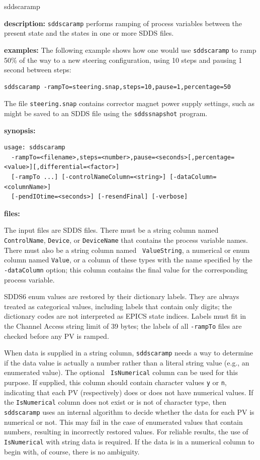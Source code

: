 \begin{sddsprog}{sddscaramp}
\item \textbf{description:}
\verb+sddscaramp+ performs ramping of process variables between
the present state and the states in one or more SDDS files.

\item \textbf{examples:}
The following example shows how one would use \verb+sddscaramp+ to
ramp 50\% of the way to a new steering configuration, using 10
steps and pausing 1 second between steps:
\begin{verbatim}
sddscaramp -rampTo=steering.snap,steps=10,pause=1,percentage=50
\end{verbatim}
The file \verb+steering.snap+ contains corrector magnet power supply
settings, such as might be saved to an SDDS file using the
\verb+sddssnapshot+ program.
\item \textbf{synopsis:}
\begin{verbatim}
usage: sddscaramp
  -rampTo=<filename>,steps=<number>,pause=<seconds>[,percentage=<value>][,differential=<factor>]
  [-rampTo ...] [-controlNameColumn=<string>] [-dataColumn=<columnName>]
  [-pendIOtime=<seconds>] [-resendFinal] [-verbose]
\end{verbatim}
\item \textbf{files:}

The input files are SDDS files.  There must be a string column named
{\tt ControlName}, {\tt Device}, or {\tt DeviceName} that contains the
process variable names.  There must also be a string column named {\tt
ValueString}, a numerical or enum column named {\tt Value}, or a column of
these types with the name specified by the \verb+-dataColumn+ option;
this column contains the final value for the corresponding process
variable.

SDDS6 enum values are restored by their dictionary labels. They are always
treated as categorical values, including labels that contain only digits;
the dictionary codes are not interpreted as EPICS state indices. Labels must
fit in the Channel Access string limit of 39 bytes; the labels of all
\verb+-rampTo+ files are checked before any PV is ramped.

When data is supplied in a string column, {\tt sddscaramp} needs a way
to determine if the data value is actually a number rather than a
literal string value (e.g., an enumerated value).  The optional {\tt
IsNumerical} column can be used for this purpose.  If supplied, this
column should contain character values {\tt y} or {\tt n}, indicating
that each PV (respectively) does or does not have numerical values.
If the {\tt IsNumerical} column does not exist or is not of character
type, then {\tt sddscaramp} uses an internal algorithm to decide
whether the data for each PV is numerical or not.  This may fail in
the case of enumerated values that contain numbers, resulting in
incorrectly restored values.  For reliable results, the use of {\tt
IsNumerical} with string data is required.  If the data is in a
numerical column to begin with, of course, there is no ambiguity.


\end{sddsprog}
